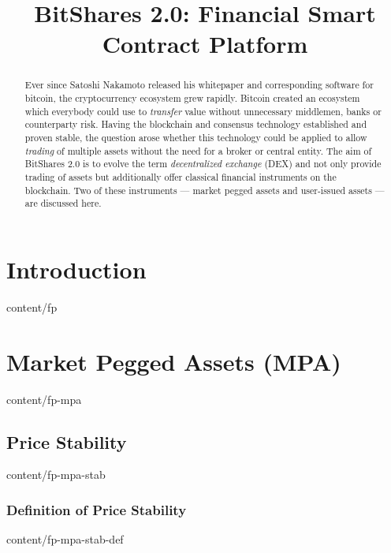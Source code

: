\documentclass{btswhitepaper}
\title{BitShares 2.0: Financial Smart Contract Platform}
\begin{document}
\sloppy
\maketitle

\begin{abstract}%
 Ever since Satoshi Nakamoto released his whitepaper and corresponding software
 for bitcoin, the cryptocurrency ecosystem grew rapidly. Bitcoin created an
 ecosystem which everybody could use to \emph{transfer} value without
 unnecessary middlemen, banks or counterparty risk. Having the blockchain
 and consensus technology established and proven stable, the question arose
 whether this technology could be applied to allow \emph{trading} of multiple
 assets without the need for a broker or central entity.
 The aim of BitShares 2.0 is to evolve the term \emph{decentralized exchange}
 (DEX) and not only provide trading of assets but additionally offer classical
 financial instruments on the blockchain. Two of these instruments --- market
 pegged assets and user-issued assets --- are discussed here.

\end{abstract}
\section        { Introduction                                     }  { content/fp                     } 

\section        { Market Pegged Assets (MPA)                       }  { content/fp-mpa                 } 
\subsection     { Price Stability                                  }  { content/fp-mpa-stab            } 
\subsubsection  { Definition of Price Stability                    }  { content/fp-mpa-stab-def        } 
\end{document}
